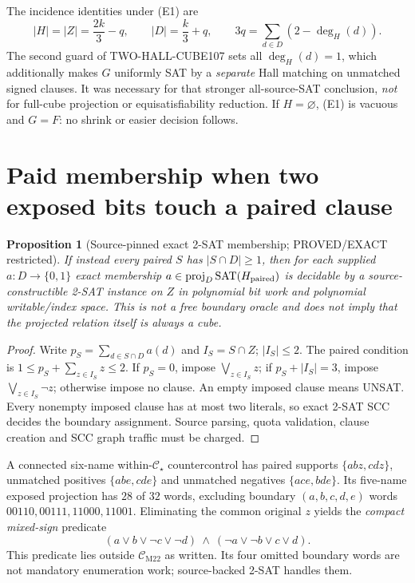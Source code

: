 \documentclass[11pt]{article}
\newtheorem{proposition}{Proposition}
\newcommand{\CM}{\mathcal C_{\mathrm{M22}}}
\newcommand{\CS}{\mathcal C_{\star}}
\begin{document}
The incidence identities under (E1) are
\[
|H|=|Z|=\frac{2k}{3}-q,\qquad
|D|=\frac{k}{3}+q,\qquad
3q=\sum_{d\in D}(2-\deg_H(d)).
\]
The second guard of TWO-HALL-CUBE107 sets all $\deg_H(d)=1$, which additionally makes $G$ uniformly SAT by a \emph{separate} Hall matching on unmatched signed clauses. It was necessary for that stronger all-source-SAT conclusion, \emph{not} for full-cube projection or equisatisfiability reduction. If $H=\varnothing$, (E1) is vacuous and $G=F$: no shrink or easier decision follows.

\section{Paid membership when two exposed bits touch a paired clause}
\begin{proposition}[Source-pinned exact 2-SAT membership; PROVED/EXACT restricted]
If instead every paired $S$ has $|S\cap D|\ge1$, then for \emph{each supplied} $a:D\to\{0,1\}$ exact membership $a\in\operatorname{proj}_D\operatorname{SAT}(H_{\rm paired})$ is decidable by a source-constructible 2-SAT instance on $Z$ in polynomial bit work and polynomial writable/index space. This is \emph{not} a free boundary oracle and does not imply that the projected relation itself is always a cube.
\end{proposition}
\begin{proof}
Write $p_S=\sum_{d\in S\cap D}a(d)$ and $I_S=S\cap Z$; $|I_S|\le2$. The paired condition is $1\le p_S+\sum_{z\in I_S}z\le2$. If $p_S=0$, impose $\bigvee_{z\in I_S}z$; if $p_S+|I_S|=3$, impose $\bigvee_{z\in I_S}\neg z$; otherwise impose no clause. An empty imposed clause means UNSAT. Every nonempty imposed clause has at most two literals, so exact 2-SAT SCC decides the boundary assignment. Source parsing, quota validation, clause creation and SCC graph traffic must be charged.
\end{proof}

A connected six-name within-$\CS$ countercontrol has paired supports $\{abz,cdz\}$, unmatched positives $\{abe,cde\}$ and unmatched negatives $\{ace,bde\}$. Its five-name exposed projection has $28$ of $32$ words, excluding boundary $(a,b,c,d,e)$ words $00110,00111,11000,11001$. Eliminating the common original $z$ yields the \emph{compact mixed-sign} predicate
\[
(a\vee b\vee\neg c\vee\neg d)\ \wedge\
(\neg a\vee\neg b\vee c\vee d).
\]
This predicate lies outside $\CM$ as written. Its four omitted boundary words are not mandatory enumeration work; source-backed 2-SAT handles them.
\end{document}
